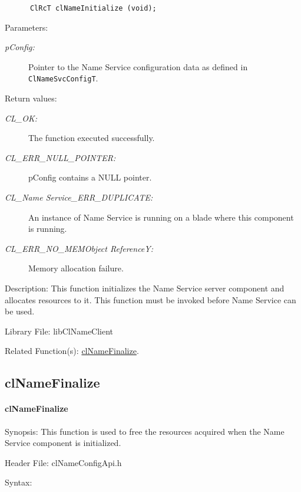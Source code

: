\begin{flushleft}
\begin{Desc}
\footnotesize\begin{verbatim}      ClRcT clNameInitialize (void);
\end{verbatim}
\normalsize
\end{Desc}
\begin{Desc}
\item[Parameters:]
\begin{description}
\item[{\em p\-Config:}]Pointer to the Name Service configuration data as defined in {\tt{ClNameSvcConfigT}}. \end{description}
\end{Desc}
\begin{Desc}
\item[Return values:]
\begin{description}
\item[{\em CL\_\-OK:}]The function executed successfully. 
\item[{\em CL\_\-ERR\_\-NULL\_\-POINTER:}]pConfig contains a NULL pointer.
\item[{\em CL\_\-Name Service\_\-ERR\_\-DUPLICATE:}]An instance of Name Service is running on a blade where this component is running.
\item[{\em CL\_\-ERR\_\-NO\_\-MEMObject ReferenceY:}]Memory allocation failure.
\end{description}
\end{Desc}
\begin{Desc}
\item[Description:]This function initializes the Name Service server component and allocates resources to it. This function must be invoked before 
Name Service can be used. 
\end{Desc}
\begin{Desc}
\item[Library File:]lib\-Cl\-Name\-Client\end{Desc}
\begin{Desc}
\item[Related Function(s):]\hyperlink{pagens102}{cl\-Name\-Finalize}. \end{Desc}
\newpage


\subsection{clNameFinalize}
\hypertarget{pagens202}{}\paragraph{cl\-Name\-Finalize}\label{pagens202}
\begin{Desc}
\item[Synopsis:]This function is used to free the resources acquired when the Name Service component is initialized.\end{Desc}
\begin{Desc}
\item[Header File:]clNameConfigApi.h\end{Desc}
\begin{Desc}
\item[Syntax:]


\end{Desc}
\end{flushleft}
